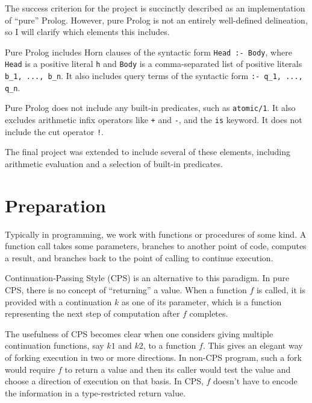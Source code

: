 \documentclass[12pt]{article}
\begin{document}
The success criterion for the project is succinctly described as an implementation of ``pure'' Prolog. However, pure Prolog is not an entirely well-defined delineation, so I will clarify which elements this includes.

Pure Prolog includes Horn clauses of the syntactic form \verb|Head :- Body|, where \verb|Head| is a positive literal \verb|h| and \verb|Body| is a comma-separated list of positive literals \verb|b_1, ..., b_n|. It also includes query terms of the syntactic form \verb|:- q_1, ..., q_n|.

Pure Prolog does not include any built-in predicates, such as \verb|atomic/1|. It also excludes arithmetic infix operators like \verb|+| and \verb|-|, and the \verb|is| keyword. It does not include the cut operator \verb|!|.

The final project was extended to include several of these elements, including arithmetic evaluation and a selection of built-in predicates.

\newpage

\section{Preparation}



Typically in programming, we work with functions or procedures of some kind. A function call takes some parameters, branches to another point of code, computes a result, and branches back to the point of calling to continue execution.

Continuation-Passing Style (CPS) is an alternative to this paradigm. In pure CPS, there is no concept of ``returning'' a value. When a function $f$ is called, it is provided with a continuation $k$ as one of its parameter, which is a function representing the next step of computation after $f$ completes. 

The usefulness of CPS becomes clear when one considers giving multiple continuation functions, say $k1$ and $k2$, to a function $f$. This gives an elegant way of forking execution in two or more directions. In non-CPS program, such a fork would require $f$ to return a value and then its caller would test the value and choose a direction of execution on that basis. In CPS, $f$ doesn't have to encode the information in a type-restricted return value.
\end{document}
